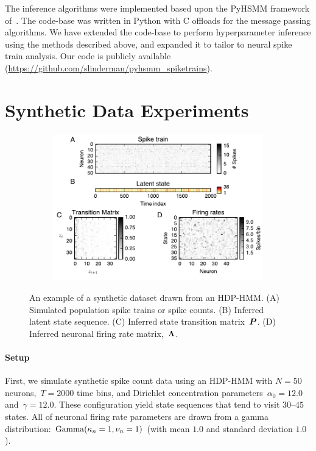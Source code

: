 The inference algorithms were implemented based upon the PyHSMM
framework of~\citep{Johnson14b}. The code-base was written in Python
with C offloads for the message passing algorithms.  We have
extended the code-base to perform hyperparameter inference using the
methods described above, and expanded it to tailor to neural spike
train analysis. Our code is publicly available
({\url{https://github.com/slinderman/pyhsmm_spiketrains}}).

\section{Synthetic Data Experiments}

\begin{figure}[t]
  \centering
  \begin{subfigure}[t]{5.in}
    \includegraphics[width=\textwidth]{figures/ch7/Fig1.pdf}
  \end{subfigure}
  \vspace{-.2in}
  \caption[A synthetic dataset drawn from an HDP-HMM]{ An example of a
    synthetic dataset drawn from an HDP-HMM.  (A) Simulated population
    spike trains or spike counts. (B) Inferred latent state
    sequence. (C) Inferred state transition matrix~$\boldsymbol{P}$. (D) Inferred
    neuronal firing rate matrix,~$\boldsymbol{\Lambda}$.}
\label{fig1}
\end{figure}

\paragraph{Setup}
\sloppy
 First, we simulate synthetic spike count data using an HDP-HMM with
 ${N=50}$ neurons,~${T=2000}$ time bins, and Dirichlet concentration
 parameters~${\alpha_0=12.0}$ and~${\gamma=12.0}$. These configuration
 yield state sequences that tend to visit $30$--$45$ states. All of
 neuronal firing rate parameters are drawn from a gamma distribution:
 ${\mathrm{Gamma}(\kappa_n=1, \nu_n=1)}$ (with mean $1.0$ and standard
 deviation $1.0$).
 
